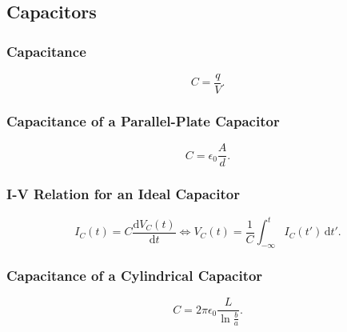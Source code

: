 
\subsection{Capacitors}

\subsubsection{Capacitance}
\begin{equation*}
  C = \frac{q}{V}
.\end{equation*}

\begin{symbols}
\end{symbols}

\subsubsection{Capacitance of a Parallel-Plate Capacitor}
\begin{equation*}
  C = \epsilon_0 \frac{A}{d}
.\end{equation*}

\begin{symbols}
\end{symbols}

\subsubsection{I-V Relation for an Ideal Capacitor}
\begin{equation*}
  I_C (t) = C \frac{\mathrm{d}V_C (t)}{\mathrm{d}t} \iff V_C (t) = \frac{1}{C} \int_{-\infty}^{t} I_C (t') \, \mathrm{d}t'
.\end{equation*}

\begin{symbols}
\end{symbols}

\subsubsection{Capacitance of a Cylindrical Capacitor}
\begin{equation*}
  C = 2 \pi \epsilon_0 \frac{L}{\ln \frac{b}{a}}
.\end{equation*}

